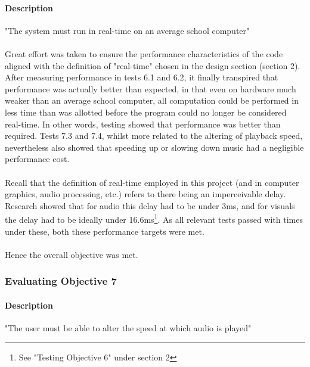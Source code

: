 \paragraph{Description} "The system must run in real-time on an average school computer"

\paragraph{}
Great effort was taken to ensure the performance characteristics of the code aligned with the definition of "real-time" chosen in the design section (section 2). After measuring performance in tests 6.1 and 6.2, it finally transpired that performance was actually better than expected, in that  even on hardware much weaker than an average school computer, all computation could be performed in less time than was allotted before the program could no longer be considered real-time. In other words, testing showed that performance was better than required.  Tests 7.3 and 7.4, whilst more related to the altering of playback speed, nevertheless also showed that speeding up or slowing down music had a negligible performance cost.

\paragraph{}
Recall that the definition of real-time employed in this project (and in computer graphics, audio processing, etc.) refers to there being an imperceivable delay. Research showed that for audio this delay had to be under 3ms, and for visuals the delay had to be ideally under 16.6ms\footnote{See "Testing Objective 6" under section 2}. As all relevant tests passed with times under these, both these performance targets were met.

\paragraph{}
Hence the overall objective was met.

\pagebreak
\subsubsection{Evaluating Objective 7}
\paragraph{Description} "The user must be able to alter the speed at which audio is played"

